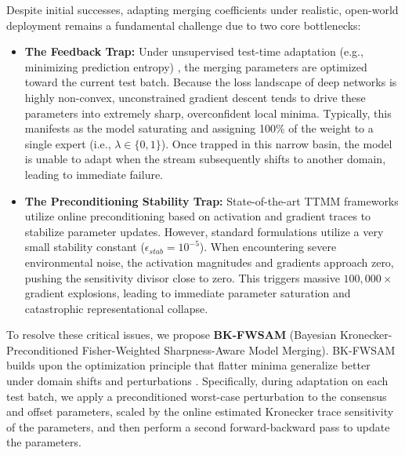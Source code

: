 \documentclass{article}
\theoremstyle{plain}
\theoremstyle{definition}
\theoremstyle{remark}
\begin{document}
Despite initial successes, adapting merging coefficients under realistic, open-world deployment remains a fundamental challenge due to two core bottlenecks:
\begin{itemize}
  \item \textbf{The Feedback Trap:} Under unsupervised test-time adaptation (e.g., minimizing prediction entropy) \cite{wang2021tent, wang2022continual, niu2022sar}, the merging parameters are optimized toward the current test batch. Because the loss landscape of deep networks is highly non-convex, unconstrained gradient descent tends to drive these parameters into extremely sharp, overconfident local minima. Typically, this manifests as the model saturating and assigning 100\% of the weight to a single expert (i.e., $\lambda \in \{0, 1\}$). Once trapped in this narrow basin, the model is unable to adapt when the stream subsequently shifts to another domain, leading to immediate failure.
  \item \textbf{The Preconditioning Stability Trap:} State-of-the-art TTMM frameworks utilize online preconditioning based on activation and gradient traces to stabilize parameter updates. However, standard formulations utilize a very small stability constant ($\epsilon_{stab} = 10^{-5}$). When encountering severe environmental noise, the activation magnitudes and gradients approach zero, pushing the sensitivity divisor close to zero. This triggers massive $100,000\times$ gradient explosions, leading to immediate parameter saturation and catastrophic representational collapse.
\end{itemize}

To resolve these critical issues, we propose \textbf{BK-FWSAM} (Bayesian Kronecker-Preconditioned Fisher-Weighted Sharpness-Aware Model Merging). BK-FWSAM builds upon the optimization principle that flatter minima generalize better under domain shifts and perturbations \cite{foret2021sharpness, kwon2021asam}. Specifically, during adaptation on each test batch, we apply a preconditioned worst-case perturbation to the consensus and offset parameters, scaled by the online estimated Kronecker trace sensitivity of the parameters, and then perform a second forward-backward pass to update the parameters.
\end{document}
